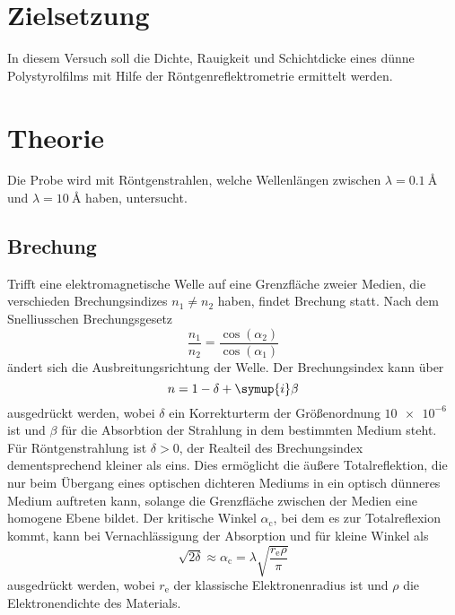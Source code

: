 \section{Zielsetzung}

    \noindent In diesem Versuch soll die Dichte, Rauigkeit und Schichtdicke eines dünne Polystyrolfilms mit Hilfe der Röntgenreflektrometrie 
    ermittelt werden. 

\section{Theorie}

    \noindent
    Die Probe wird mit Röntgenstrahlen, welche Wellenlängen zwischen $\lambda = \SI{0.1}{\angstrom}$ und $\lambda = \SI{10}{\angstrom}$ haben, 
    untersucht. 

    \subsection{Brechung}

        \noindent
        Trifft eine elektromagnetische Welle auf eine Grenzfläche zweier Medien, die verschieden Brechungsindizes $n_1 \neq n_2$ haben, findet Brechung
        statt. Nach dem Snelliusschen Brechungsgesetz 
        \begin{equation*}
            \frac{n_1}{n_2} = \frac{\cos(\alpha_2)}{\cos(\alpha_1)}
        \end{equation*}
        ändert sich die Ausbreitungsrichtung der Welle. 
        Der Brechungsindex kann über 
        \begin{equation*}
            n = 1 - \delta + \symup{i} \beta 
        \end{equation*}
        ausgedrückt werden, wobei $\delta$ ein Korrekturterm der Größenordnung $\num{10e-6}$ ist und $\beta$ für die Absorbtion der Strahlung in dem 
        bestimmten Medium steht. 
        Für Röntgenstrahlung ist $\delta > 0$, der Realteil des Brechungsindex dementsprechend kleiner als eins. 
        Dies ermöglicht die äußere Totalreflektion, die nur beim Übergang eines optischen dichteren Mediums in ein optisch dünneres Medium auftreten kann, 
        solange die Grenzfläche zwischen der Medien eine homogene Ebene bildet. 
        Der kritische Winkel $\alpha_\text{c}$, bei dem es zur Totalreflexion kommt, kann bei Vernachlässigung der Absorption und für kleine Winkel als 
        \begin{equation*}
            \sqrt{2 \delta} \approx \alpha_\text{c} = \lambda \sqrt{\frac{r_\text{e} \rho}{\pi}}
        \end{equation*}
        ausgedrückt werden, wobei $r_\text{e}$ der klassische Elektronenradius ist und $\rho$ die Elektronendichte des Materials. 

